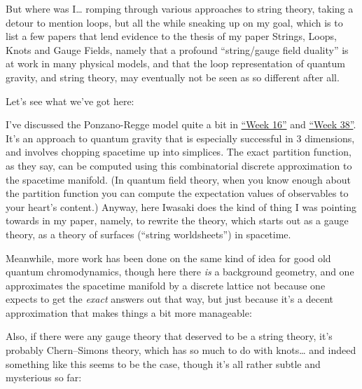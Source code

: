 \documentclass[12pt]{article}
\def\tightlist{}
\renewcommand{\texttt}[1]{%
  \begingroup
  \ttfamily
  \begingroup\lccode`~=`/\lowercase{\endgroup\def~}{/\discretionary{}{}{}}%
  \begingroup\lccode`~=`[\lowercase{\endgroup\def~}{[\discretionary{}{}{}}%
  \begingroup\lccode`~=`.\lowercase{\endgroup\def~}{.\discretionary{}{}{}}%
  \catcode`/=\active\catcode`[=\active\catcode`.=\active
  \scantokens{#1\noexpand}%
  \endgroup
}
\begin{document}
But where was I\ldots{} romping through various approaches to string
theory, taking a detour to mention loops, but all the while sneaking up
on my goal, which is to list a few papers that lend evidence to the
thesis of my paper Strings, Loops, Knots and Gauge Fields, namely that a
profound ``string/gauge field duality'' is at work in many physical
models, and that the loop representation of quantum gravity, and string
theory, may eventually not be seen as so different after all.

Let's see what we've got here:


I've discussed the Ponzano-Regge model quite a bit in
\protect\hyperlink{week16}{``Week 16''} and
\protect\hyperlink{week38}{``Week 38''}. It's an approach to quantum
gravity that is especially successful in 3 dimensions, and involves
chopping spacetime up into simplices. The exact partition function, as
they say, can be computed using this combinatorial discrete
approximation to the spacetime manifold. (In quantum field theory, when
you know enough about the partition function you can compute the
expectation values of observables to your heart's content.) Anyway, here
Iwasaki does the kind of thing I was pointing towards in my paper,
namely, to rewrite the theory, which starts out as a gauge theory, as a
theory of surfaces (``string worldsheets'') in spacetime.

Meanwhile, more work has been done on the same kind of idea for good old
quantum chromodynamics, though here there \emph{is} a background
geometry, and one approximates the spacetime manifold by a discrete
lattice not because one expects to get the \emph{exact} answers out that
way, but just because it's a decent approximation that makes things a
bit more manageable:

\noindent
Also, if there were any gauge theory that deserved to be a string
theory, it's probably Chern--Simons theory, which has so much to do with
knots\ldots{} and indeed something like this seems to be the case,
though it's all rather subtle and mysterious so far:
\end{document}
